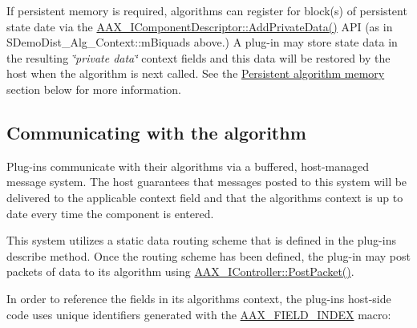 If persistent memory is required, algorithms can register for block(s) of persistent state date via the \hyperlink{a00088_a125949841a13e97ff93fa321f2050433}{A\+A\+X\+\_\+\+I\+Component\+Descriptor\+::\+Add\+Private\+Data()} A\+P\+I (as in S\+Demo\+Dist\+\_\+\+Alg\+\_\+\+Context\+::m\+Biquads above.) A plug-\/in may store state data in the resulting {\itshape \char`\"{}private data\char`\"{}} context fields and this data will be restored by the host when the algorithm is next called. See the \hyperlink{a00327_alg_pd}{Persistent algorithm memory} section below for more information. 

 \hypertarget{a00327_alg_comm}{}\subsection{Communicating with the algorithm}\label{a00327_alg_comm}
 Plug-\/ins communicate with their algorithms via a buffered, host-\/managed message system. The host guarantees that messages posted to this system will be delivered to the applicable context field and that the algorithm\textquotesingle{}s context is up to date every time the component is entered.

 This system utilizes a static data routing scheme that is defined in the plug-\/in\textquotesingle{}s describe method. Once the routing scheme has been defined, the plug-\/in may post packets of data to its algorithm using \hyperlink{a00090_ae5dd2b5925dbc181513bca1c4ac5e716}{A\+A\+X\+\_\+\+I\+Controller\+::\+Post\+Packet()}.

 In order to reference the fields in its algorithm\textquotesingle{}s context, the plug-\/in\textquotesingle{}s host-\/side code uses unique identifiers generated with the \hyperlink{a00149_acf807247ecd6e5899dc9dc31644e9a1d}{A\+A\+X\+\_\+\+F\+I\+E\+L\+D\+\_\+\+I\+N\+D\+E\+X} macro\+:


